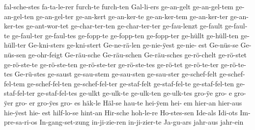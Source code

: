 {  fal-sche-stes %
  fa-ta-le-rer %
  furch-te %
  furch-ten %
  Gal-li-ers %
  ge-an-gelt %
  ge-an-gel-tem %
  ge-an-gel-ten %
  ge-an-gel-ter %
  ge-an-kert %
  ge-an-ker-te %
  ge-an-ker-tem %
  ge-an-ker-ter %
  ge-an-ker-tes %
  ge-ant-wor-tet %
  ge-char-ter-ten %
  ge-char-ter-ter %
  ge-fau-lenzt %
  ge-fault %
  ge-faul-te %
  ge-faul-ter %
  ge-faul-tes %
  ge-fopp-te %
  ge-fopp-ten %
  ge-fopp-ter %
  ge-h^^fcllt %
  ge-h^^fcll-ten %
  ge-h^^fcll-ter %
  Ge-kni-sters %
  ge-kni-stert %
  Ge-ne-r^^e4-len %
  ge-nie-^^ffest %
  ge-nie-^^Yest
  Ge-n^^fcs-se %
  Ge-n^^fcs-sen %
  ge-ohr-feigt %
  Ge-r^^e4u-sche %
  Ge-r^^e4u-schen %
  Ge-r^^e4u-sches %
  ge-r^^f6-chelt %
  ge-r^^f6-stet %
  ge-r^^f6-ste-te %
  ge-r^^f6-ste-ten %
  ge-r^^f6-ste-ter %
  ge-r^^f6-ste-tes %
  ge-r^^f6-tet %
  ge-r^^f6-te-ter %
  ge-r^^f6-te-tes %
  Ge-r^^fc-stes %
  ge-saust %
  ge-sau-stem %
  ge-sau-sten %
  ge-sau-ster %
  ge-schef-felt %
  ge-schef-fel-tem %
  ge-schef-fel-ten %
  ge-schef-fel-ter %
  ge-staf-felt %
  ge-staf-fel-te %
  ge-staf-fel-ten %
  ge-staf-fel-ter %
  ge-staf-fel-tes %
  ge-ulkt %
  ge-ulk-te %
  ge-ulk-ten %
  ge-ulk-tes %
  gro-^^ffe %
  gro-^^Ye
  gro-^^ffer %
  gro-^^Yer
  gro-^^ffes %
  gro-^^Yes
  h^^e4k-le %
  H^^e4l-se %
  hau-te %
  hei-^^ffem %
  hei-^^Yem
  hier-an %
  hier-aus %
  hie-^^ffest %
  hie-^^Yest
  hilf-lo-se %
  hint-an %
  Hir-sche %
  hoh-le-re %
  Ho-stes-sen %
  Ide-als %
  Idi-ots %
  Im-pre-sa-ri-os %
  In-gang-set-zung %
  in-ji-zie-ren %
  in-ji-zier-te %
  Ja-gu-ars %
  jahr-aus %
  jahr-ein %
}
